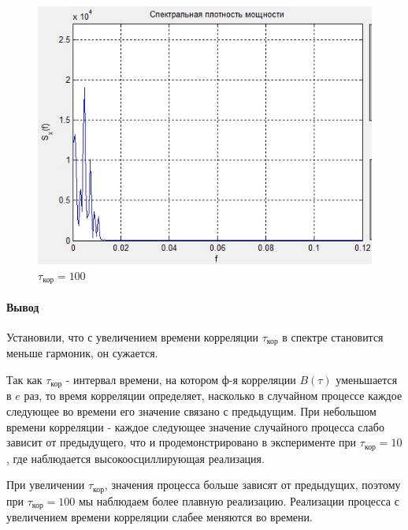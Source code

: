 \begin{figure}[H]
\begin{minipage}{0.3\linewidth}
        \includegraphics[width=\linewidth]{fig/realize100_sp.jpg}
		\caption*{$\tau_\text{кор}=100$}
	\end{minipage}
\end{figure}
\paragraph{Вывод} Установили, что с увеличением времени корреляции $\tau_\text{кор}$ в спектре становится меньше гармоник, он сужается.

Так как $\tau_\text{кор}$ - интервал времени, на котором ф-я корреляции $B(\tau)$ уменьшается в $e$ раз, то время
корреляции определяет, насколько в случайном процессе каждое следующее во времени его значение связано с предыдущим. 
При небольшом времени корреляции - каждое следующее значение случайного процесса слабо зависит от предыдущего, что и
продемонстрировано в эксперименте при $\tau_\text{кор}=10$, где наблюдается высокоосциллирующая реализация.

При увеличении $\tau_\text{кор}$, значения процесса больше зависят от предыдущих, поэтому при
$\tau_\text{кор} = 100$ мы наблюдаем более плавную реализацию. Реализации процесса с увеличением времени корреляции
слабее меняются во времени.


